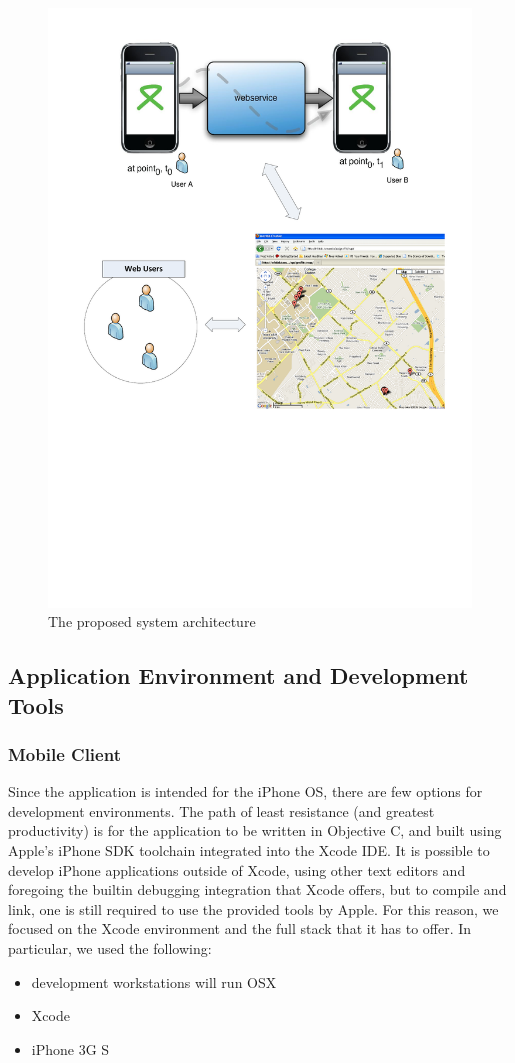 \documentclass{chi2009}
\begin{document}
\begin{figure}
\centering
\includegraphics[width=.5\textwidth]{architecture.pdf}
\caption{The proposed system architecture}
\label{fig:arch}
\end{figure}

\subsection{Application Environment and Development Tools}

\subsubsection{Mobile Client}

Since the application is intended for the iPhone OS, there are few options for
development environments.  The path of least resistance (and greatest
productivity) is for the application to be written in Objective C, and built
using Apple's iPhone SDK toolchain integrated into the Xcode IDE.  It is
possible to develop iPhone applications outside of Xcode, using other text
editors and foregoing the builtin debugging integration that Xcode offers, but
to compile and link, one is still required to use the provided tools by Apple.
For this reason, we focused on the Xcode environment and the full
stack that it has to offer.  In particular, we used the following:

\begin{itemize}
\item development workstations will run OSX
\item Xcode
\item iPhone 3G S
\end{itemize}
\end{document}
